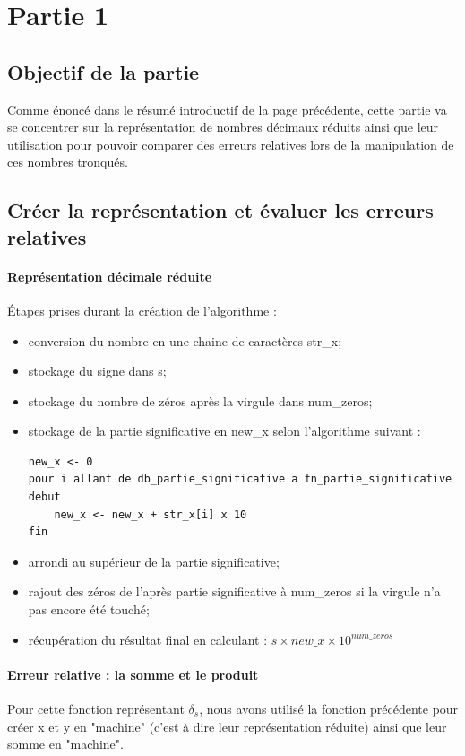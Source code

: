 \documentclass[svgnames]{report}
\begin{document}
\chapter{Partie 1}
\section{Objectif de la partie}
Comme énoncé dans le résumé introductif de la page précédente, cette partie va se concentrer sur la représentation de nombres décimaux réduits ainsi que leur utilisation pour pouvoir comparer des erreurs relatives lors de la manipulation de ces nombres tronqués.

\section{Créer la représentation et évaluer les erreurs relatives}
\subsubsection{Représentation décimale réduite}
Étapes prises durant la création de l'algorithme : 
\begin{itemize}
    \item conversion du nombre en une chaine de caractères str\_x;
    \item stockage du signe dans s;
    \item stockage du nombre de zéros après la virgule dans num\_zeros;
    \item stockage de la partie significative en new\_x selon l'algorithme suivant :
    \noindent\begin{lstlisting}[frame=single,style=python]
new_x <- 0
pour i allant de db_partie_significative a fn_partie_significative
debut
    new_x <- new_x + str_x[i] x 10
fin
    \end{lstlisting}
    
    \item arrondi au supérieur de la partie significative;
    \item rajout des zéros de l'après partie significative à num\_zeros si la virgule n'a pas encore été touché;
    \item récupération du résultat final en calculant : $s\times{new\_x}\times{10^{num\_zeros}}$
\end{itemize}


\subsubsection{Erreur relative : la somme et le produit}
\noindent Pour cette fonction représentant $\delta_s$, nous avons utilisé la fonction précédente pour créer x et y en "machine" (c'est à dire leur représentation réduite) ainsi que leur somme en "machine". 
\end{document}
